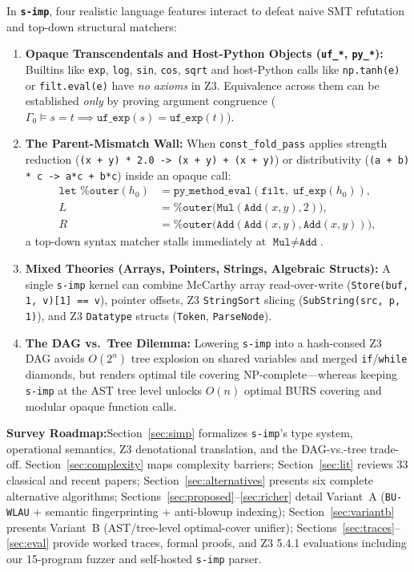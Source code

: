\documentclass[11pt,a4paper]{article}
\newcommand{\takeaway}[2]{%
  \vspace{6pt}\noindent\colorbox{primary!8}{%
    \parbox{\dimexpr\linewidth-2\fboxsep\relax}{%
      \vspace{4pt}\textbf{\color{primary}#1:}\hspace{0.5em}#2\vspace{4pt}%
    }%
  }\vspace{6pt}%
}
\begin{document}
In \textbf{\texttt{s-imp}}, four realistic language features interact to defeat naive SMT refutation and top-down structural matchers:
\begin{enumerate}
  \item \textbf{Opaque Transcendentals and Host-Python Objects (\texttt{uf\_*}, \texttt{py\_*}):} Builtins like \texttt{exp}, \texttt{log}, \texttt{sin}, \texttt{cos}, \texttt{sqrt} and host-Python calls like \texttt{np.tanh(e)} or \texttt{filt.eval(e)} have \emph{no axioms} in Z3. Equivalence across them can be established \emph{only} by proving argument congruence ($\Gamma_0 \models s = t \implies \texttt{uf\_exp}(s) = \texttt{uf\_exp}(t)$).
  \item \textbf{The Parent-Mismatch Wall:} When \texttt{const\_fold\_pass} applies strength reduction (\texttt{(x + y) * 2.0 -> (x + y) + (x + y)}) or distributivity (\texttt{(a + b) * c -> a*c + b*c}) inside an opaque call:
  \begin{align*}
    \texttt{let \%outer}(h_0) &= \texttt{py\_method\_eval}(\texttt{filt},\; \texttt{uf\_exp}(h_0)), \\
    L &= \texttt{\%outer}\big(\texttt{Mul}(\texttt{Add}(x, y), 2)\big), \\
    R &= \texttt{\%outer}\big(\texttt{Add}(\texttt{Add}(x, y), \texttt{Add}(x, y))\big),
  \end{align*}
  a top-down syntax matcher stalls immediately at $\texttt{Mul} \neq \texttt{Add}$.
  \item \textbf{Mixed Theories (Arrays, Pointers, Strings, Algebraic Structs):} A single \texttt{s-imp} kernel can combine McCarthy array read-over-write (\texttt{Store(buf, 1, v)[1] == v}), pointer offsets, Z3 \texttt{StringSort} slicing (\texttt{SubString(src, p, 1)}), and Z3 \texttt{Datatype} structs (\texttt{Token}, \texttt{ParseNode}).
  \item \textbf{The DAG vs.\ Tree Dilemma:} Lowering \texttt{s-imp} into a hash-consed Z3 DAG avoids $O(2^n)$ tree explosion on shared variables and merged \texttt{if}/\texttt{while} diamonds, but renders optimal tile covering NP-complete---whereas keeping \texttt{s-imp} at the AST tree level unlocks $O(n)$ optimal BURS covering and modular opaque function calls.
\end{enumerate}

\takeaway{Survey Roadmap}{Section~\ref{sec:simp} formalizes \texttt{s-imp}'s type system, operational semantics, Z3 denotational translation, and the DAG-vs.-tree trade-off. Section~\ref{sec:complexity} maps complexity barriers; Section~\ref{sec:lit} reviews 33 classical and recent papers; Section~\ref{sec:alternatives} presents six complete alternative algorithms; Sections~\ref{sec:proposed}--\ref{sec:richer} detail Variant~A (\texttt{BU-WLAU} + semantic fingerprinting + anti-blowup indexing); Section~\ref{sec:variantb} presents Variant~B (AST/tree-level optimal-cover unifier); Sections~\ref{sec:traces}--\ref{sec:eval} provide worked traces, formal proofs, and Z3 5.4.1 evaluations including our 15-program fuzzer and self-hosted \texttt{s-imp} parser.}
\end{document}
